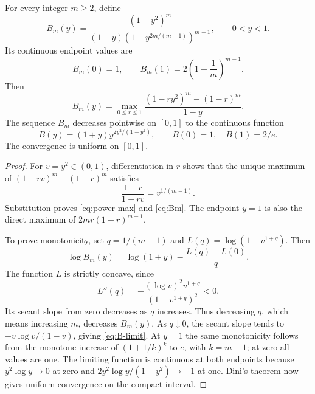 \begin{lemma}\label{lem:power-envelope}
For every integer $m\ge2$, define
\begin{equation}\label{eq:Bm}
 B_m(y)=\frac{(1-y^2)^m}
 {(1-y)(1-y^{2m/(m-1)})^{m-1}},\qquad 0<y<1.
\end{equation}
Its continuous endpoint values are
\[
 B_m(0)=1,\qquad B_m(1)=2\left(1-\frac1m\right)^{m-1}.
\]
Then
\begin{equation}\label{eq:power-max}
 B_m(y)=\max_{0\le r\le1}
 \frac{(1-ry^2)^m-(1-r)^m}{1-y}.
\end{equation}
The sequence $B_m$ decreases pointwise on $[0,1]$ to the continuous
function
\begin{equation}\label{eq:B-limit}
 B(y)=(1+y)y^{2y^2/(1-y^2)},\qquad B(0)=1,\quad B(1)=2/e.
\end{equation}
The convergence is uniform on $[0,1]$.
\end{lemma}
\begin{proof}
For $v=y^2\in(0,1)$, differentiation in $r$ shows that the unique
maximum of $(1-rv)^m-(1-r)^m$ satisfies
\[
 \frac{1-r}{1-rv}=v^{1/(m-1)}.
\]
Substitution proves \eqref{eq:power-max} and \eqref{eq:Bm}.
The endpoint $y=1$ is also the direct maximum of
$2mr(1-r)^{m-1}$.

To prove monotonicity, set $q=1/(m-1)$ and
$L(q)=\log(1-v^{1+q})$. Then
\[
 \log B_m(y)=\log(1+y)-\frac{L(q)-L(0)}q.
\]
The function $L$ is strictly concave, since
\[
 L''(q)=-\frac{(\log v)^2v^{1+q}}{(1-v^{1+q})^2}<0.
\]
Its secant slope from zero decreases as $q$ increases. Thus decreasing
$q$, which means increasing $m$, decreases $B_m(y)$.
As $q\downarrow0$, the secant slope tends to
$-v\log v/(1-v)$, giving \eqref{eq:B-limit}.
At $y=1$ the same monotonicity follows from the monotone increase of
$(1+1/k)^k$ to $e$, with $k=m-1$; at zero all values are one.
The limiting function is continuous at both endpoints because
$y^2\log y\to0$ at zero and
$2y^2\log y/(1-y^2)\to-1$ at one.
Dini's theorem now gives uniform convergence on the compact interval.
\end{proof}

